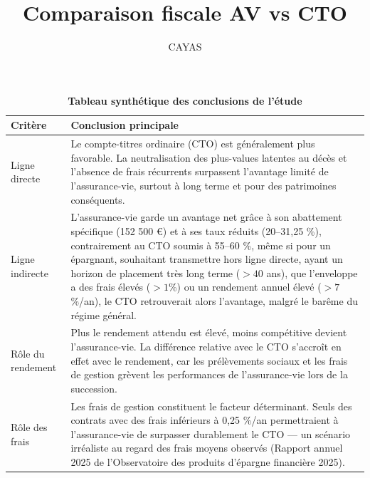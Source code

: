 \documentclass[a4paper, 11pt]{article}
\title{\textbf{Comparaison fiscale AV vs CTO}}
\author{CAYAS}
\date{}
\begin{document}
\pagestyle{plain} %

\begin{table}[h!]
    \caption{\textbf{Tableau synthétique des conclusions de l'étude}}
    \label{tab:synthese}
    \centering
    \setlength{\tabcolsep}{6pt}
    \renewcommand{\arraystretch}{1.5}

    \begin{tabular}{p{3cm}p{10cm}} 
        \toprule 
        \rowcolor{HeaderGray} \textbf{Critère} & \textbf{Conclusion principale} \\
        \midrule 
        \rowcolor{white} Ligne directe & Le compte-titres ordinaire (CTO) est généralement plus favorable. La neutralisation des plus-values latentes au décès et l’absence de frais récurrents surpassent l’avantage limité de l’assurance-vie, surtout à long terme et pour des patrimoines conséquents. \\
        \rowcolor{LightFushia} Ligne indirecte & L’assurance-vie garde un avantage net grâce à son abattement spécifique (152 500 €) et à ses taux réduits (20–31,25 \%), contrairement au CTO soumis à 55–60 \%, même si pour un épargnant, souhaitant transmettre hors ligne directe, ayant un horizon de placement très long terme ($> 40$ ans), que l’enveloppe a des frais élevés ($> 1$\%) ou un rendement annuel élevé ($> 7$\%/an), le CTO retrouverait alors l’avantage, malgré le barême du régime général. \\
        \rowcolor{white} Rôle du rendement & Plus le rendement attendu est élevé, moins compétitive devient l’assurance-vie. La différence relative avec le CTO s’accroît en effet avec le rendement, car les prélèvements sociaux et les frais de gestion grèvent les performances de l’assurance-vie lors de la succession. \\
        \rowcolor{LightFushia} Rôle des frais & Les frais de gestion constituent le facteur déterminant. Seuls des contrats avec des frais inférieurs à 0,25 \%/an permettraient à l’assurance-vie de surpasser durablement le CTO — un scénario irréaliste au regard des frais moyens observés (Rapport annuel 2025 de l’Observatoire des produits d’épargne financière 2025). \\
        \bottomrule 
    \end{tabular}
\end{table}

\newpage 

\tableofcontents
\newpage
\end{document}

